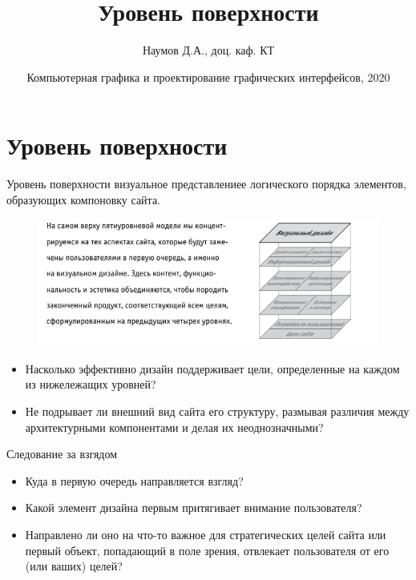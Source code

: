 \documentclass{beamer}
\title[Уровень поверхности]{Уровень поверхности}
\author{Наумов Д.А., доц. каф. КТ}
\date[21.10.2020] {Компьютерная графика и проектирование графических интерфейсов, 2020}
\begin{document}
\begin{frame}
  \titlepage
\end{frame}
  

\section{Уровень поверхности}
  
\begin{frame}[t]
	\begin{block}{Уровень поверхности}
		визуальное представлениее логического порядка элементов, образующих компоновку сайта. 
	\end{block}
	\begin{figure}[h]
		\centering
		\includegraphics[scale=0.5]{images/lec05-pic01.png}
	\end{figure}
	\begin{itemize}
		\item Насколько эффективно дизайн поддерживает цели, определенные на каждом из нижележащих уровней? 
		\item Не подрывает ли внешний вид сайта его структуру, размывая различия между архитектурными компонентами и делая их неоднозначными?
	\end{itemize}
\end{frame} 

\begin{frame}[t]{Следование за взгядом}
	\begin{itemize}
		\item Куда в первую очередь направляется взгляд? 
		\item Какой элемент дизайна первым притягивает внимание пользователя? 
		\item Направлено ли оно на что-то важное для стратегических целей сайта или первый объект, попадающий в поле зрения, отвлекает пользователя от его (или ваших) целей?
	\end{itemize}
\end{frame}
\end{document}
